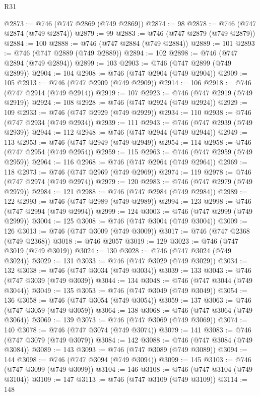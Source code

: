 \begin{lexlean}{R31}
\begin{coremodule}
@2873 := @746 (@747 @2869 (@749 @2869))
@2874 := 98
@2878 := @746 (@747 @2874 (@749 @2874))
@2879 := 99
@2883 := @746 (@747 @2879 (@749 @2879))
@2884 := 100
@2888 := @746 (@747 @2884 (@749 @2884))
@2889 := 101
@2893 := @746 (@747 @2889 (@749 @2889))
@2894 := 102
@2898 := @746 (@747 @2894 (@749 @2894))
@2899 := 103
@2903 := @746 (@747 @2899 (@749 @2899))
@2904 := 104
@2908 := @746 (@747 @2904 (@749 @2904))
@2909 := 105
@2913 := @746 (@747 @2909 (@749 @2909))
@2914 := 106
@2918 := @746 (@747 @2914 (@749 @2914))
@2919 := 107
@2923 := @746 (@747 @2919 (@749 @2919))
@2924 := 108
@2928 := @746 (@747 @2924 (@749 @2924))
@2929 := 109
@2933 := @746 (@747 @2929 (@749 @2929))
@2934 := 110
@2938 := @746 (@747 @2934 (@749 @2934))
@2939 := 111
@2943 := @746 (@747 @2939 (@749 @2939))
@2944 := 112
@2948 := @746 (@747 @2944 (@749 @2944))
@2949 := 113
@2953 := @746 (@747 @2949 (@749 @2949))
@2954 := 114
@2958 := @746 (@747 @2954 (@749 @2954))
@2959 := 115
@2963 := @746 (@747 @2959 (@749 @2959))
@2964 := 116
@2968 := @746 (@747 @2964 (@749 @2964))
@2969 := 118
@2973 := @746 (@747 @2969 (@749 @2969))
@2974 := 119
@2978 := @746 (@747 @2974 (@749 @2974))
@2979 := 120
@2983 := @746 (@747 @2979 (@749 @2979))
@2984 := 121
@2988 := @746 (@747 @2984 (@749 @2984))
@2989 := 122
@2993 := @746 (@747 @2989 (@749 @2989))
@2994 := 123
@2998 := @746 (@747 @2994 (@749 @2994))
@2999 := 124
@3003 := @746 (@747 @2999 (@749 @2999))
@3004 := 125
@3008 := @746 (@747 @3004 (@749 @3004))
@3009 := 126
@3013 := @746 (@747 @3009 (@749 @3009))
@3017 := @746 (@747 @2368 (@749 @2368))
@3018 := @746 @2057
@3019 := 129
@3023 := @746 (@747 @3019 (@749 @3019))
@3024 := 130
@3028 := @746 (@747 @3024 (@749 @3024))
@3029 := 131
@3033 := @746 (@747 @3029 (@749 @3029))
@3034 := 132
@3038 := @746 (@747 @3034 (@749 @3034))
@3039 := 133
@3043 := @746 (@747 @3039 (@749 @3039))
@3044 := 134
@3048 := @746 (@747 @3044 (@749 @3044))
@3049 := 135
@3053 := @746 (@747 @3049 (@749 @3049))
@3054 := 136
@3058 := @746 (@747 @3054 (@749 @3054))
@3059 := 137
@3063 := @746 (@747 @3059 (@749 @3059))
@3064 := 138
@3068 := @746 (@747 @3064 (@749 @3064))
@3069 := 139
@3073 := @746 (@747 @3069 (@749 @3069))
@3074 := 140
@3078 := @746 (@747 @3074 (@749 @3074))
@3079 := 141
@3083 := @746 (@747 @3079 (@749 @3079))
@3084 := 142
@3088 := @746 (@747 @3084 (@749 @3084))
@3089 := 143
@3093 := @746 (@747 @3089 (@749 @3089))
@3094 := 144
@3098 := @746 (@747 @3094 (@749 @3094))
@3099 := 145
@3103 := @746 (@747 @3099 (@749 @3099))
@3104 := 146
@3108 := @746 (@747 @3104 (@749 @3104))
@3109 := 147
@3113 := @746 (@747 @3109 (@749 @3109))
@3114 := 148

\end{coremodule}
\end{lexlean}
